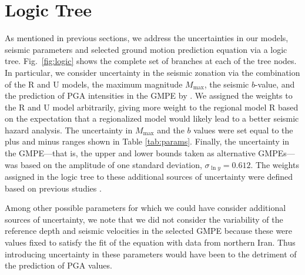 
\section{Logic Tree}

As mentioned in previous sections, we address the uncertainties in our models, seismic parameters and selected ground motion prediction equation via a logic tree. Fig.~\ref{fig:logic} shows the complete set of branches at each of the tree nodes. In particular, we consider uncertainty in the seismic zonation via the combination of the R and U models, the maximum magnitude $M_{\max}$, the seismic $b$-value, and the prediction of PGA intensities in the GMPE by \citet{Kalkan2004}. We assigned the weights to the R and U model arbitrarily, giving more weight to the regional model R based on the expectation that a regionalized model would likely lead to a better seismic hazard analysis. The uncertainty in $M_{\max}$ and the $b$ values were set equal to the plus and minus ranges shown in Table \ref{tab:params}. Finally, the uncertainty in the GMPE---that is, the upper and lower bounds taken as alternative GMPEs---was based on the amplitude of one standard deviation, $\sigma_{\ln y} = 0.612$. The weights assigned in the logic tree to these additional sources of uncertainty were defined based on previous studies \citep[e.g.,][]{Petersen2008}.

Among other possible parameters for which we could have consider additional sources of uncertainty, we note that we did not consider the variability of the reference depth and seismic velocities in the selected GMPE because these were values fixed to satisfy the fit of the equation with data from northern Iran. Thus introducing uncertainty in these parameters would have been to the detriment of the prediction of PGA values.

